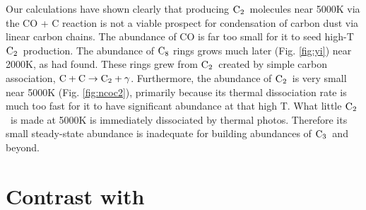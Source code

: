 \documentclass[manuscript]{aastex}
\newcommand{\ctwo}{{\rm C}_2}
\newcommand{\cthree}{{\rm C}_3}
\newcommand{\ceight}{{\rm C}_8}
\newcommand{\twoctoctwo}{${\rm C} + {\rm C} \to \ctwo + \gamma$}
\begin{document}
Our calculations have shown clearly that producing $\ctwo$\ molecules near
5000K via the CO + C reaction \citep{2009ApJ...703..642C} is not a viable
prospect for condensation of carbon dust via linear carbon chains.
The abundance of CO is far too small for it to seed high-T $\ctwo$\ production.
The abundance of $\ceight$
rings grows much later (Fig. \ref{fig:yi}) near 2000K, as
\citet{1999Sci...283.1290C,2001ApJ...562..480C} had found.
These rings grew from $\ctwo$\ created by simple carbon association,
\twoctoctwo.
Furthermore, the abundance of $\ctwo$\ is very small near 5000K
(Fig. \ref{fig:ncoc2}),
primarily because its thermal dissociation rate is much too fast for
it to have significant abundance at that high T.
What little $\ctwo$\ is made at 5000K is immediately dissociated by
thermal photos. Therefore its small steady-state abundance is inadequate
for building abundances of $\cthree$\ and beyond. 

\section{Contrast with \citet{2009ApJ...703..642C}}
\end{document}

